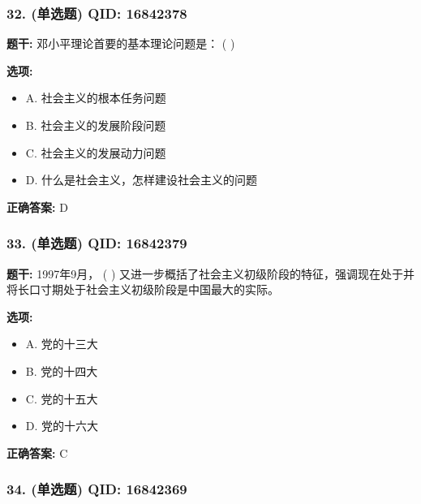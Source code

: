 \documentclass[12pt,UTF8]{ctexart}
\begin{document}
\subsubsection*{32. (单选题) \small QID: 16842378}

\textbf{题干:}
邓小平理论首要的基本理论问题是： ( )

\textbf{选项:}
\begin{itemize}[leftmargin=*]

  \item A. 社会主义的根本任务问题

  \item B. 社会主义的发展阶段问题

  \item C. 社会主义的发展动力问题

  \item D. 什么是社会主义，怎样建设社会主义的问题

\end{itemize}

\textbf{正确答案:}
D

\vspace{0.3em}\hrulefill\vspace{0.7em}

\subsubsection*{33. (单选题) \small QID: 16842379}

\textbf{题干:}
1997年9月， ( ) 又进一步概括了社会主义初级阶段的特征，强调现在处于并将长口寸期处于社会主义初级阶段是中国最大的实际。

\textbf{选项:}
\begin{itemize}[leftmargin=*]

  \item A. 党的十三大

  \item B. 党的十四大

  \item C. 党的十五大

  \item D. 党的十六大

\end{itemize}

\textbf{正确答案:}
C

\vspace{0.3em}\hrulefill\vspace{0.7em}

\subsubsection*{34. (单选题) \small QID: 16842369}
\end{document}
